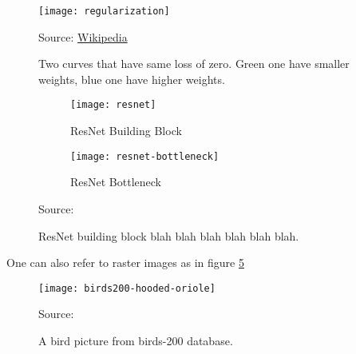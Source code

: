 \begin{figure}[!h]
\centering
\texttt{[image: regularization]}
\caption{Two curves that have same loss of zero. Green one have smaller weights, blue one have higher weights. }\label{fig:regularization}
{Source: \href{https://commons.wikimedia.org/wiki/File:Regularization.svg}{Wikipedia}\hfill}
\end{figure}


\begin{figure}[!h]
\centering
    \begin{subfigure}[b]{0.4\textwidth}
        \texttt{[image: resnet]}
        \caption{ResNet Building Block}\label{fig:resnet-block}
    \end{subfigure}
    \begin{subfigure}[b]{0.4\textwidth}
        \texttt{[image: resnet-bottleneck]}
        \caption{ResNet Bottleneck}\label{fig:resnet-bottleneck}
    \end{subfigure}
\caption{ResNet building block blah blah blah blah blah blah.}\label{fig:resnet}
{Source: \cite{he2016deep}\hfill}
\end{figure}


One can also refer to raster images as in figure \ref{fig:birds200}

\begin{figure}[!h]
\centering
\texttt{[image: birds200-hooded-oriole]}
\caption{A bird picture from birds-200 database.}\label{fig:birds200}
{Source: \cite{WahCUB_200_2011}\hfill}
\end{figure}

